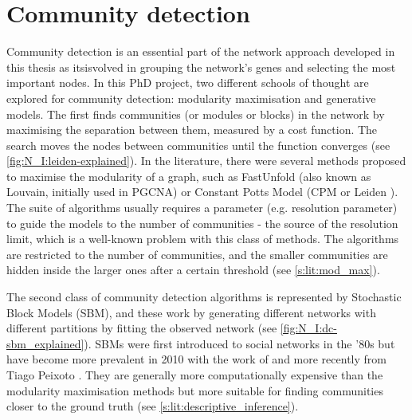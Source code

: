 \section{Community detection} \label{s:lit:comm_detect}

\vspace{3mm}
\vspace{3mm}

Community detection is an essential part of the network approach developed in this thesis as itsisvolved in grouping the network's genes and selecting the most important nodes. In this PhD project, two different schools of thought are explored for community detection: modularity maximisation and generative models. The first finds communities (or modules or blocks) in the network by maximising the separation between them, measured by a cost function. The search moves the nodes between communities until the function converges (see \cref{fig:N_I:leiden-explained}). In the literature, there were several methods proposed to maximise the modularity of a graph, such as FastUnfold \citep{Blondel2008-ik} (also known as Louvain, initially used in PGCNA) or Constant Potts Model (CPM or Leiden \citet{Traag2019-ne}). The suite of algorithms usually requires a parameter (e.g. resolution parameter) to guide the models to the number of communities - the source of the resolution limit, which is a well-known problem with this class of methods. The algorithms are restricted to the number of communities, and the smaller communities are hidden inside the larger ones after a certain threshold (see \cref{s:lit:mod_max}).

The second class of community detection algorithms is represented by Stochastic Block Models (SBM), and these work by generating different networks with different partitions by fitting the observed network (see \cref{fig:N_I:dc-sbm_explained}). SBMs were first introduced to social networks \citep{Holland1983-eu} in the '80s but have become more prevalent in 2010 with the work of \citet{Karrer2011-si} and more recently from Tiago Peixoto \citep{Peixoto2014-ls,Peixoto2019-fg,Peixoto2018-ot,Peixoto2023-se,Peixoto2024-ua}. They are generally more computationally expensive than the modularity maximisation methods but more suitable for finding communities closer to the ground truth (see \cref{s:lit:descriptive_inference}).

